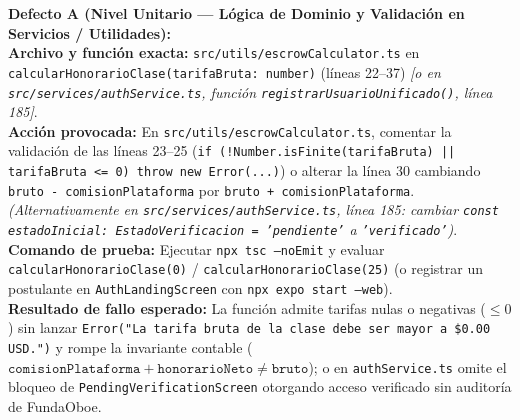 \documentclass[10pt,letterpaper]{article}
\begin{document}
\begin{tcolorbox}[
  colback=atrilDangerTint,
  colframe=atrilDanger,
  boxrule=0.8pt,
  arc=4pt,
  left=8pt,
  right=8pt,
  top=5pt,
  bottom=5pt
]
  {\footnotesize\bfseries\color{atrilDangerText} Defecto A (Nivel Unitario --- Lógica de Dominio y Validación en Servicios / Utilidades):}\\[2pt]
  {\footnotesize\color{atrilTextBody}
  \textbf{Archivo y función exacta:} \texttt{src/utils/escrowCalculator.ts} en \texttt{calcularHonorarioClase(tarifaBruta: number)} (líneas 22--37) \emph{[o en \texttt{src/services/authService.ts}, función \texttt{registrarUsuarioUnificado()}, línea 185]}.\\[1pt]
  \textbf{Acción provocada:} En \texttt{src/utils/escrowCalculator.ts}, comentar la validación de las líneas 23--25 (\texttt{if (!Number.isFinite(tarifaBruta) || tarifaBruta <= 0) throw new Error(...)}) o alterar la línea 30 cambiando \texttt{bruto - comisionPlataforma} por \texttt{bruto + comisionPlataforma}. \emph{(Alternativamente en \texttt{src/services/authService.ts}, línea 185: cambiar \texttt{const estadoInicial: EstadoVerificacion = 'pendiente'} a \texttt{'verificado'})}.\\[1pt]
  \textbf{Comando de prueba:} Ejecutar \texttt{npx tsc --noEmit} y evaluar \texttt{calcularHonorarioClase(0)} / \texttt{calcularHonorarioClase(25)} (o registrar un postulante en \texttt{AuthLandingScreen} con \texttt{npx expo start --web}).\\[1pt]
  \textbf{Resultado de fallo esperado:} La función admite tarifas nulas o negativas ($\le 0$) sin lanzar \texttt{Error("La tarifa bruta de la clase debe ser mayor a \$0.00 USD.")} y rompe la invariante contable ($\texttt{comisionPlataforma} + \texttt{honorarioNeto} \neq \texttt{bruto}$); o en \texttt{authService.ts} omite el bloqueo de \texttt{PendingVerificationScreen} otorgando acceso verificado sin auditoría de FundaOboe.}
\end{tcolorbox}

\vspace{0.10cm}
\end{document}
